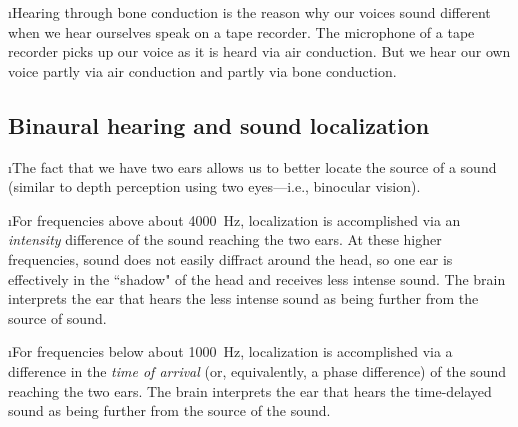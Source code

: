 \i Hearing through bone conduction is the reason why our
voices sound different when we hear ourselves speak on a tape recorder.
The microphone of a tape recorder picks up our voice as it 
is heard via air conduction.
But we hear our own voice partly via air conduction and partly via
bone conduction.

\ei
\subsection{Binaural hearing and sound localization}
\bi

\i The fact that we have two ears allows us to better 
locate the source of a sound (similar to depth perception
using two eyes---i.e., binocular vision).
 
\i For frequencies above about 4000~Hz, localization is
accomplished via an {\em intensity} difference of the 
sound reaching the two ears.
At these higher frequencies, sound does not easily 
diffract around the head, so one ear is effectively in
the ``shadow" of the head and receives less intense sound.
The brain interprets the ear that hears the less 
intense sound as being further from the source of sound.

\i For frequencies below about 1000~Hz, localization is
accomplished via a difference in the {\em time of arrival}
(or, equivalently, a phase difference) of the sound 
reaching the two ears.
The brain interprets the ear that hears the time-delayed 
sound as being further from the source of the sound.

\ei
